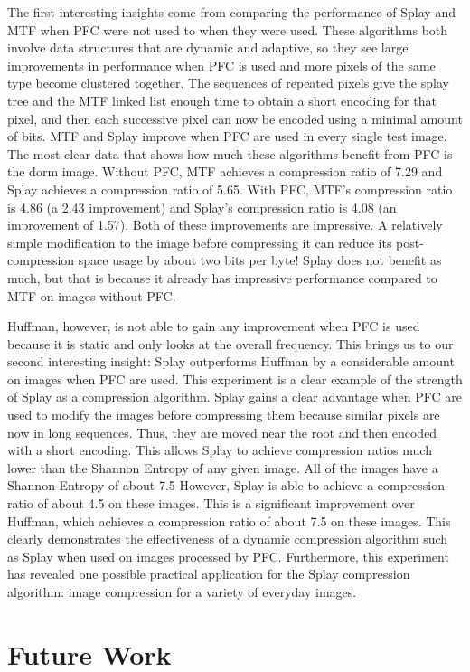 \documentclass[twoside]{article}
\begin{document}
\begin{multicols}{2}
The first interesting insights come from comparing the performance of Splay and MTF when PFC were not used to when they were used. These algorithms both involve data structures that are dynamic and adaptive, so they see large improvements in performance when PFC is used and more pixels of the same type become clustered together. The sequences of repeated pixels give the splay tree and the MTF linked list enough time to obtain a short encoding for that pixel, and then each successive pixel can now be encoded using a minimal amount of bits. MTF and Splay improve when PFC are used in every single test image. The most clear data that shows how much these algorithms benefit from PFC is the dorm image. Without PFC, MTF achieves a compression ratio of 7.29 and Splay achieves a compression ratio of 5.65. With PFC, MTF's compression ratio is 4.86 (a 2.43 improvement) and Splay's compression ratio is 4.08 (an improvement of 1.57). Both of these improvements are impressive. A relatively simple modification to the image before compressing it can reduce its post-compression space usage by about two bits per byte! Splay does not benefit as much, but that is because it already has impressive performance compared to MTF on images without PFC. 

Huffman, however, is not able to gain any improvement when PFC is used because it is static and only looks at the overall frequency. This brings us to our second interesting insight: Splay outperforms Huffman by a considerable amount on images when PFC are used. This experiment is a clear example of the strength of Splay as a compression algorithm. Splay gains a clear advantage when PFC are used to modify the images before compressing them because similar pixels are now in long sequences. Thus, they are moved near the root and then encoded with a short encoding. This allows Splay to achieve compression ratios much lower than the Shannon Entropy of any given image. All of the images have a Shannon Entropy of about 7.5 However, Splay is able to achieve a compression ratio of about 4.5 on these images. This is a significant improvement over Huffman, which achieves a compression ratio of about 7.5 on these images. This clearly demonstrates the effectiveness of a dynamic compression algorithm such as Splay when used on images processed by PFC. Furthermore, this experiment has revealed one possible practical application for the Splay compression algorithm: image compression for a variety of everyday images.

\section{Future Work}


\end{multicols}
\end{document}
